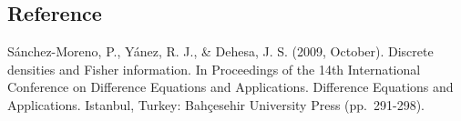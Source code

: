 \documentclass[
]{article}
\begin{document}
\subsection{Reference}\label{reference}

Sánchez-Moreno, P., Yánez, R. J., \& Dehesa, J. S. (2009, October).
Discrete densities and Fisher information. In Proceedings of the 14th
International Conference on Difference Equations and Applications.
Difference Equations and Applications. Istanbul, Turkey: Bahçesehir
University Press (pp.~291-298).
\end{document}
